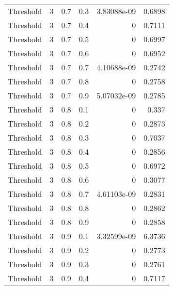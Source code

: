 \documentclass{article}
\begin{document}
\begin{longtable}[H]{lrrrrr}
 Threshold      &       3 &   0.7 &            0.3 &      3.83088e-09 &          0.6898 \\
 Threshold      &       3 &   0.7 &            0.4 &      0           &          0.7111 \\
 Threshold      &       3 &   0.7 &            0.5 &      0           &          0.6997 \\
 Threshold      &       3 &   0.7 &            0.6 &      0           &          0.6952 \\
 Threshold      &       3 &   0.7 &            0.7 &      4.10688e-09 &          0.2742 \\
 Threshold      &       3 &   0.7 &            0.8 &      0           &          0.2758 \\
 Threshold      &       3 &   0.7 &            0.9 &      5.07032e-09 &          0.2785 \\
 Threshold      &       3 &   0.8 &            0.1 &      0           &          0.337  \\
 Threshold      &       3 &   0.8 &            0.2 &      0           &          0.2873 \\
 Threshold      &       3 &   0.8 &            0.3 &      0           &          0.7037 \\
 Threshold      &       3 &   0.8 &            0.4 &      0           &          0.2856 \\
 Threshold      &       3 &   0.8 &            0.5 &      0           &          0.6972 \\
 Threshold      &       3 &   0.8 &            0.6 &      0           &          0.3077 \\
 Threshold      &       3 &   0.8 &            0.7 &      4.61103e-09 &          0.2831 \\
 Threshold      &       3 &   0.8 &            0.8 &      0           &          0.2862 \\
 Threshold      &       3 &   0.8 &            0.9 &      0           &          0.2858 \\
 Threshold      &       3 &   0.9 &            0.1 &      3.32599e-09 &          6.3736 \\
 Threshold      &       3 &   0.9 &            0.2 &      0           &          0.2773 \\
 Threshold      &       3 &   0.9 &            0.3 &      0           &          0.2761 \\
 Threshold      &       3 &   0.9 &            0.4 &      0           &          0.7117 \\

\end{longtable}
\end{document}

